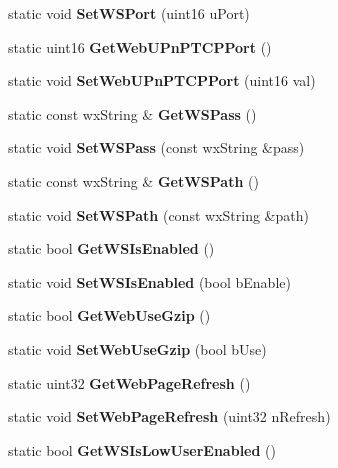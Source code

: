 \begin{DoxyCompactItemize}
\item 
static void {\bfseries SetWSPort} (uint16 uPort)\label{classCPreferences_a240489beb499c7471eb71a5e3984eed6}

\item 
static uint16 {\bfseries GetWebUPnPTCPPort} ()\label{classCPreferences_a77501cbb2b95a3035578956f20552470}

\item 
static void {\bfseries SetWebUPnPTCPPort} (uint16 val)\label{classCPreferences_a05b988df72d145954c6b9bd70ec4abab}

\item 
static const wxString \& {\bfseries GetWSPass} ()\label{classCPreferences_a772cadd40771902a11d784500d02c95f}

\item 
static void {\bfseries SetWSPass} (const wxString \&pass)\label{classCPreferences_aed6632b4a4e79ffddcd7e1c70e37edbe}

\item 
static const wxString \& {\bfseries GetWSPath} ()\label{classCPreferences_ac212f350fecf70dd4c59ff42177d425e}

\item 
static void {\bfseries SetWSPath} (const wxString \&path)\label{classCPreferences_abf80abb0fef2986f74b66302dbbecb41}

\item 
static bool {\bfseries GetWSIsEnabled} ()\label{classCPreferences_a3c4f6dedc76b8244bd01dd6bc143e63f}

\item 
static void {\bfseries SetWSIsEnabled} (bool bEnable)\label{classCPreferences_af858b50eb1d2266e09bf3160fcc3c297}

\item 
static bool {\bfseries GetWebUseGzip} ()\label{classCPreferences_a1f579c3957af002c695a066e5845fcdb}

\item 
static void {\bfseries SetWebUseGzip} (bool bUse)\label{classCPreferences_a33707f12c23eb21b5e80ab42bcf41d26}

\item 
static uint32 {\bfseries GetWebPageRefresh} ()\label{classCPreferences_a0f48c247953da25671b1d768c6614301}

\item 
static void {\bfseries SetWebPageRefresh} (uint32 nRefresh)\label{classCPreferences_a6873113051b3b4d47ce90a67ed0b7069}

\item 
static bool {\bfseries GetWSIsLowUserEnabled} ()\label{classCPreferences_ac77cccdb3508b94026bbae2b07862c83}


\end{DoxyCompactItemize}
